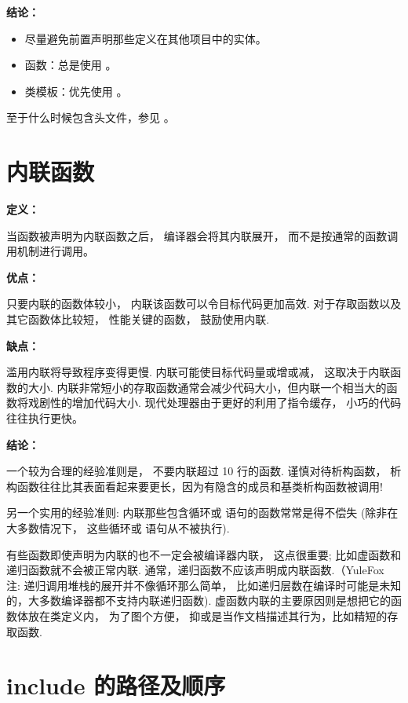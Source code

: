 \textbf{结论：}

\begin{itemize}
	\item 尽量避免前置声明那些定义在其他项目中的实体。
	\item 函数：总是使用  。
	\item 类模板：优先使用  。
\end{itemize}

至于什么时候包含头文件，参见  。


\section{内联函数} \label{inline-functions}


\textbf{定义：}

当函数被声明为内联函数之后， 编译器会将其内联展开， 而不是按通常的函数调用机制进行调用。

\textbf{优点：}

只要内联的函数体较小， 内联该函数可以令目标代码更加高效. 对于存取函数以及其它函数体比较短， 性能关键的函数， 鼓励使用内联.

\textbf{缺点：}

滥用内联将导致程序变得更慢. 内联可能使目标代码量或增或减， 这取决于内联函数的大小. 内联非常短小的存取函数通常会减少代码大小，但内联一个相当大的函数将戏剧性的增加代码大小. 现代处理器由于更好的利用了指令缓存， 小巧的代码往往执行更快。

\textbf{结论：}

一个较为合理的经验准则是， 不要内联超过 10 行的函数. 谨慎对待析构函数， 析构函数往往比其表面看起来要更长，因为有隐含的成员和基类析构函数被调用!

另一个实用的经验准则: 内联那些包含循环或  语句的函数常常是得不偿失 (除非在大多数情况下， 这些循环或  语句从不被执行).

有些函数即使声明为内联的也不一定会被编译器内联， 这点很重要; 比如虚函数和递归函数就不会被正常内联. 通常，递归函数不应该声明成内联函数.（YuleFox 注: 递归调用堆栈的展开并不像循环那么简单， 比如递归层数在编译时可能是未知的，大多数编译器都不支持内联递归函数). 虚函数内联的主要原因则是想把它的函数体放在类定义内， 为了图个方便， 抑或是当作文档描述其行为，比如精短的存取函数.

\section{ include 的路径及顺序} \label{name-and-order-of-includes}

